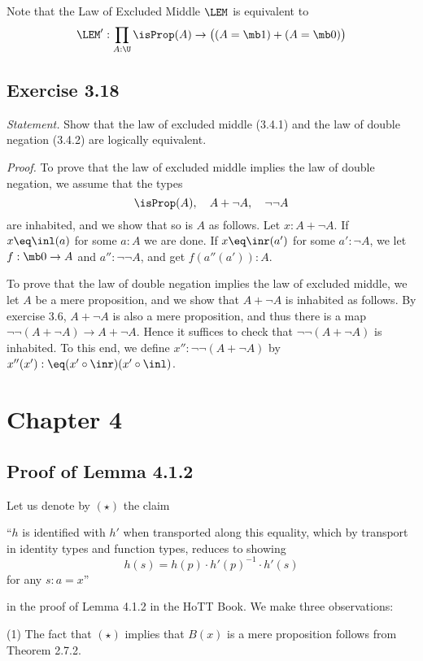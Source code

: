 \documentclass[12pt]{article}
\begin{document}
Note that the Law of Excluded Middle $\LEM$ is equivalent to 
$$
\LEM':\prod_{A:\U}\isProp(A)\to\big((A=\mb1)+(A=\mb0)\big)
$$ 


\subsection{Exercise 3.18}

\emph{Statement.} Show that the law of excluded middle (3.4.1) and the law of double negation (3.4.2) are logically equivalent.

\nn\emph{Proof.} To prove that the law of excluded middle implies the law of double negation, we assume that the types 
$$
\isProp(A),\quad A+\neg A,\quad \neg\neg A
$$ 
are inhabited, and we show that so is $A$ as follows. Let $x:A+\neg A$. If $x\eq\inl(a)$ for some $a:A$ we are done. If $x\eq\inr(a')$ for some $a':\neg A$, we let $f:\mb0\to A$ and $a'':\neg\neg A$, and get $f(a''(a')):A$. 

To prove that the law of double negation implies the law of excluded middle, we let $A$ be a mere proposition, and we show that $A+\neg A$ is inhabited as follows. By exercise 3.6, $A+\neg A$ is also a mere proposition, and thus there is a map $\neg\neg(A+\neg A)\to A+\neg A$. Hence it suffices to check that $\neg\neg(A+\neg A)$ is inhabited. To this end, we define $x'':\neg\neg(A+\neg A)$ by $x''(x'):\eq(x'\circ\inr)(x'\circ\inl)$.


\section{Chapter 4}

\subsection{Proof of Lemma 4.1.2}

Let us denote by $(\star)$ the claim 

\nn ``$h$ is identified with $h'$ when transported along this equality, which by transport in identity types and function types, reduces to showing 
$$
h(s)=h(p)\cdot h'(p)^{-1}\cdot h'(s)
$$ 
for any $s:a=x$''

\nn in the proof of Lemma 4.1.2 in the HoTT Book. We make three observations:

\nn(1) The fact that $(\star)$ implies that $B(x)$ is a mere proposition follows from Theorem 2.7.2. 
\end{document}
